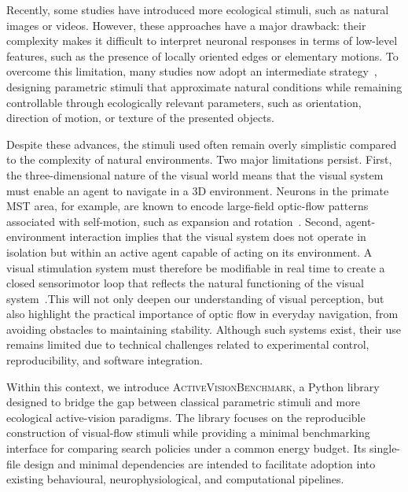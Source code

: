 \documentclass[12pt,a4paper]{article}
\newcommand{\avb}{\textsc{ActiveVisionBenchmark}}  %
\newcommand{\MST}{\textsc{MST}}  %
\begin{document}
Recently, some studies have introduced more ecological stimuli, such as natural images or videos. However, these approaches have a major drawback: their complexity makes it difficult to interpret neuronal responses in terms of low-level features, such as the presence of locally oriented edges or elementary motions. To overcome this limitation, many studies now adopt an intermediate strategy~\parencite{Rust2005}, designing parametric stimuli that approximate natural conditions while remaining controllable through ecologically relevant parameters, such as orientation, direction of motion, or texture of the presented objects.

Despite these advances, the stimuli used often remain overly simplistic compared to the complexity of natural environments. Two major limitations persist. First, the three-dimensional nature of the visual world means that the visual system must enable an agent to navigate in a 3D environment. Neurons in the primate \MST{} area, for example, are known to encode large-field optic-flow patterns associated with self-motion, such as expansion and rotation~\parencite{DuffyWurtz1991}. Second, agent-environment interaction implies that the visual system does not operate in isolation but within an active agent capable of acting on its environment. A visual stimulation system must therefore be modifiable in real time to create a closed sensorimotor loop that reflects the natural functioning of the visual system~\parencite{Bajcsy1988}.This will not only deepen our understanding of visual perception, but also highlight the practical importance of optic flow in everyday navigation, from avoiding obstacles to maintaining stability. Although such systems exist, their use remains limited due to technical challenges related to experimental control, reproducibility, and software integration.

Within this context, we introduce \avb{}, a Python library designed to bridge the gap between classical parametric stimuli and more ecological active-vision paradigms. The library focuses on the reproducible construction of visual-flow stimuli while providing a minimal benchmarking interface for comparing search policies under a common energy budget. Its single-file design and minimal dependencies are intended to facilitate adoption into existing behavioural, neurophysiological, and computational pipelines.
\end{document}
